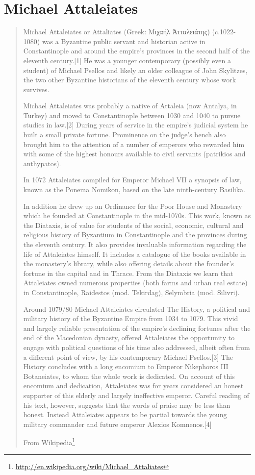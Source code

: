 \documentclass[12pt,letterpaper,twoside,final]{memoir}
\begin{document}
\section{Michael Attaleiates}
\blockquote[From Wikipedia\footnote{\url{http://en.wikipedia.org/wiki/Michael_Attaliates}}]{Michael Attaleiates or Attaliates (Greek: Μιχαήλ Ἀτταλειάτης) (c.1022-1080) was a Byzantine public servant and historian active in Constantinople and around the empire's provinces in the second half of the eleventh century.[1] He was a younger contemporary (possibly even a student) of Michael Psellos and likely an older colleague of John Skylitzes, the two other Byzantine historians of the eleventh century whose work survives.

Michael Attaleiates was probably a native of Attaleia (now Antalya, in Turkey) and moved to Constantinople between 1030 and 1040 to pursue studies in law.[2] During years of service in the empire's judicial system he built a small private fortune. Prominence on the judge's bench also brought him to the attention of a number of emperors who rewarded him with some of the highest honours available to civil servants (patrikios and anthypatos).

In 1072 Attaleiates compiled for Emperor Michael VII a synopsis of law, known as the Ponema Nomikon, based on the late ninth-century Basilika.

In addition he drew up an Ordinance for the Poor House and Monastery which he founded at Constantinople in the mid-1070s. This work, known as the Diataxis, is of value for students of the social, economic, cultural and religious history of Byzantium in Constantinople and the provinces during the eleventh century. It also provides invaluable information regarding the life of Attaleiates himself. It includes a catalogue of the books available in the monastery's library, while also offering details about the founder's fortune in the capital and in Thrace. From the Diataxis we learn that Attaleiates owned numerous properties (both farms and urban real estate) in Constantinople, Raidestos (mod. Tekirdag), Selymbria (mod. Silivri).

Around 1079/80 Michael Attaleiates circulated The History, a political and military history of the Byzantine Empire from 1034 to 1079. This vivid and largely reliable presentation of the empire's declining fortunes after the end of the Macedonian dynasty, offered Attaleiates the opportunity to engage with political questions of his time also addressed, albeit often from a different point of view, by his contemporary Michael Psellos.[3] The History concludes with a long encomium to Emperor Nikephoros III Botaneiates, to whom the whole work is dedicated. On account of this encomium and dedication, Attaleiates was for years considered an honest supporter of this elderly and largely ineffective emperor. Careful reading of his text, however, suggests that the words of praise may be less than honest. Instead Attaleiates appears to be partial towards the young military commander and future emperor Alexios Komnenos.[4]

}
\end{document}
